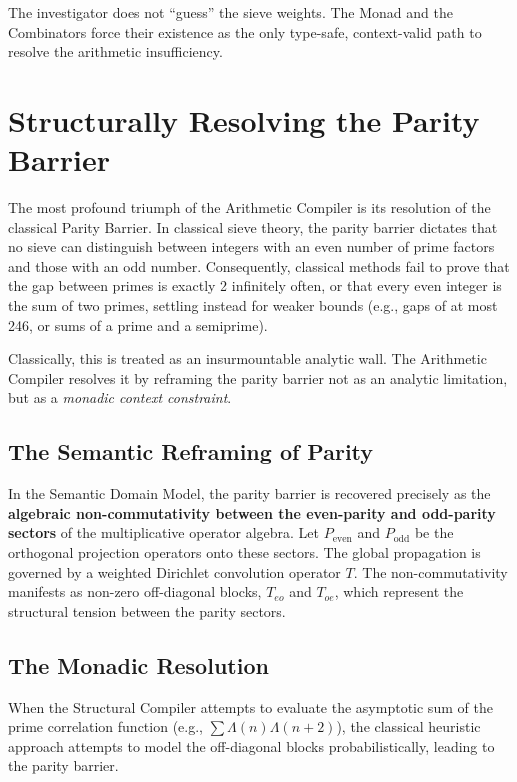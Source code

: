 \documentclass[12pt,openany]{extbook}
\theoremstyle{plain}
\theoremstyle{definition}
\begin{document}
The investigator does not ``guess'' the sieve weights. The Monad and the Combinators force their existence as the only type-safe, context-valid path to resolve the arithmetic insufficiency.

\section{Structurally Resolving the Parity Barrier}

The most profound triumph of the Arithmetic Compiler is its resolution of the classical Parity Barrier. In classical sieve theory, the parity barrier dictates that no sieve can distinguish between integers with an even number of prime factors and those with an odd number. Consequently, classical methods fail to prove that the gap between primes is exactly 2 infinitely often, or that every even integer is the sum of two primes, settling instead for weaker bounds (e.g., gaps of at most 246, or sums of a prime and a semiprime).

Classically, this is treated as an insurmountable analytic wall. The Arithmetic Compiler resolves it by reframing the parity barrier not as an analytic limitation, but as a \emph{monadic context constraint}.

\subsection{The Semantic Reframing of Parity}
In the Semantic Domain Model, the parity barrier is recovered precisely as the \textbf{algebraic non-commutativity between the even-parity and odd-parity sectors} of the multiplicative operator algebra. Let $P_{\text{even}}$ and $P_{\text{odd}}$ be the orthogonal projection operators onto these sectors. The global propagation is governed by a weighted Dirichlet convolution operator $T$. The non-commutativity manifests as non-zero off-diagonal blocks, $T_{eo}$ and $T_{oe}$, which represent the structural tension between the parity sectors.

\subsection{The Monadic Resolution}
When the Structural Compiler attempts to evaluate the asymptotic sum of the prime correlation function (e.g., $\sum \Lambda(n)\Lambda(n+2)$), the classical heuristic approach attempts to model the off-diagonal blocks probabilistically, leading to the parity barrier.
\end{document}
